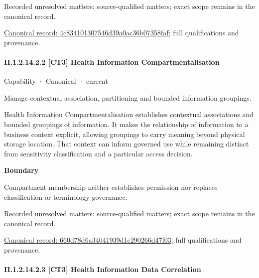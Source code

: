 {\small Recorded unresolved matters: source-qualified matters; exact scope remains in the canonical record.}\par
{\footnotesize \href{../../../../continuum/strategy/capability/4c834101307546d39a0ac36b07358faf.md}{Canonical record: 4c834101307546d39a0ac36b07358faf}; full qualifications and provenance.}\par
\paragraph*{II.1.2.14.2.2 [CT3] Health Information Compartmentalisation}
\label{navigation:II.1.2.14.2.2}

\label{element:660d78d6a34041939d1c290266d47f03}
{\small Capability · Canonical · current}\par

Manage contextual association, partitioning and bounded information groupings.



Health Information Compartmentalisation establishes contextual associations and bounded groupings of information. It makes the relationship of information to a business context explicit, allowing groupings to carry meaning beyond physical storage location. That context can inform governed use while remaining distinct from sensitivity classification and a particular access decision.



\textbf{Boundary}



Compartment membership neither establishes permission nor replaces classification or terminology governance.


{\small Recorded unresolved matters: source-qualified matters; exact scope remains in the canonical record.}\par
{\footnotesize \href{../../../../continuum/strategy/capability/660d78d6a34041939d1c290266d47f03.md}{Canonical record: 660d78d6a34041939d1c290266d47f03}; full qualifications and provenance.}\par
\paragraph*{II.1.2.14.2.3 [CT3] Health Information Data Correlation}
\label{navigation:II.1.2.14.2.3}

